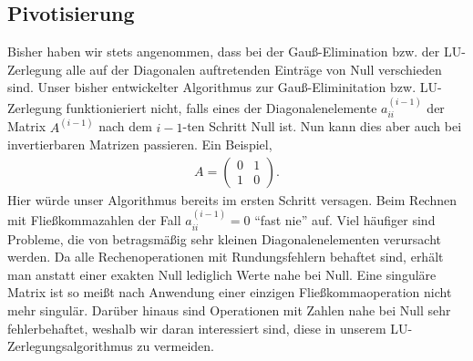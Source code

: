 \subsection{Pivotisierung}
Bisher haben wir stets angenommen, dass bei der Gauß-Elimination bzw. der
LU-Zerlegung alle auf der Diagonalen auftretenden Einträge von Null verschieden
sind. Unser bisher entwickelter Algorithmus zur Gauß-Eliminitation bzw. LU-Zerlegung
funktionieriert nicht, falls eines der Diagonalenelemente $a_{ii}^{(i-1)}$ der
Matrix $A^{(i-1)}$ nach dem $i-1$-ten Schritt Null ist. Nun kann dies aber auch
bei invertierbaren Matrizen passieren. Ein Beispiel,
\begin{align*}
A=\begin{pmatrix}
0 & 1\\ 1 & 0
\end{pmatrix}.
\end{align*}
Hier würde unser Algorithmus bereits im ersten Schritt versagen.
Beim Rechnen mit Fließkommazahlen der Fall $a_{ii}^{(i-1)}=0$ ``fast nie'' auf.
Viel häufiger sind Probleme, die von betragsmäßig sehr kleinen
Diagonalenelementen verursacht werden. Da alle Rechenoperationen mit
Rundungsfehlern behaftet sind, erhält man anstatt einer exakten Null lediglich
Werte nahe bei Null. Eine singuläre Matrix ist so meißt nach Anwendung einer einzigen
Fließkommaoperation nicht mehr singulär. Darüber hinaus sind Operationen mit
Zahlen nahe bei Null sehr fehlerbehaftet, weshalb wir daran interessiert sind,
diese in unserem LU-Zerlegungsalgorithmus zu vermeiden.

